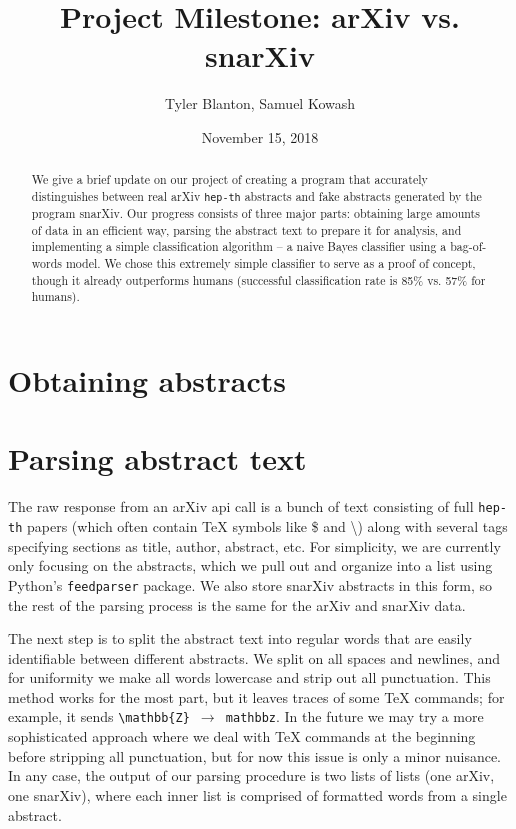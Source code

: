 \documentclass{article}
\title{Project Milestone: arXiv vs. snarXiv}
\author{Tyler Blanton, Samuel Kowash}
\date{November 15, 2018}
\begin{document}
\maketitle

\begin{abstract}
We give a brief update on our project of creating a program that accurately distinguishes between real arXiv \texttt{hep-th} abstracts and fake abstracts generated by the program snarXiv.
Our progress consists of three major parts: obtaining large amounts of data in an efficient way, parsing the abstract text to prepare it for analysis, and implementing a simple classification algorithm -- a naive Bayes classifier using a bag-of-words model.
We chose this extremely simple classifier to serve as a proof of concept, though it already outperforms humans (successful classification rate is 85\% vs. 57\% for humans).
\end{abstract}

\section{Obtaining abstracts}



\section{Parsing abstract text}
The raw response from an arXiv api call is a bunch of text consisting of full \texttt{hep-th} papers (which often contain TeX symbols like \$ and  \textbackslash) along with several tags specifying sections as title, author, abstract, etc.
For simplicity, we are currently only focusing on the abstracts, which we pull out and organize into a list using Python's \texttt{feedparser} package.
We also store snarXiv abstracts in this form, so the rest of the parsing process is the same for the arXiv and snarXiv data.

The next step is to split the abstract text into regular words that are easily identifiable between different abstracts.
We split on all spaces and newlines, and for uniformity we make all words lowercase and strip out all punctuation.
This method works for the most part, but it leaves traces of some TeX commands; for example, it sends \texttt{\textbackslash mathbb\{Z\} $\to$ mathbbz}.
In the future we may try a more sophisticated approach where we deal with TeX commands at the beginning before stripping all punctuation, but for now this issue is only a minor nuisance.
In any case, the output of our parsing procedure is two lists of lists (one arXiv, one snarXiv), where each inner list is comprised of formatted words from a single abstract.
\end{document}
